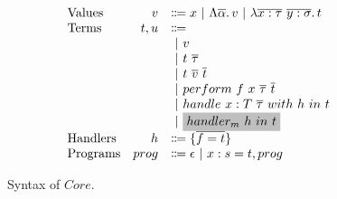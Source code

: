 \documentclass[acmsmall]{acmart}
\newcommand{\graybox}[1]{\colorbox{lightgray}{$\displaystyle #1$}}
\newcommand{\vor}{~|~}
\newcommand{\ap}{~}
\begin{document}
\begin{figure}
    \[
        \begin{array}{lrll}
              \text{Values} &v &\Coloneqq x \vor \Lambda \overline{\alpha} \ldotp v \vor \lambda \overline{x : \tau}~\overline{y : \sigma}\ldotp t
              \\
              \text{Terms} &t, u &\Coloneqq \\
              &&\vor v \\
              &&\vor t\ap\overline{\tau} \\
              &&\vor t \ap \overline{v} \ap \overline{t} \\
              &&\vor perform ~ f \ap x \ap \overline{\tau} \ap \overline{t} \\
              &&\vor handle ~ x : T \ap \overline{\tau} ~with ~h~in ~t \\
              &&\vor \graybox{handler_m ~ h ~ in ~ t}
              \\
              \text{Handlers} &h &\Coloneqq \{ \overline{f = t} \}
              \\
              \text{Programs} &prog &\Coloneqq \epsilon \vor x : s = t, prog
        \end{array}
    \]
    \caption{Syntax of $Core$.}
    \label{fig:core-syntax}
\end{figure}




\end{document}
